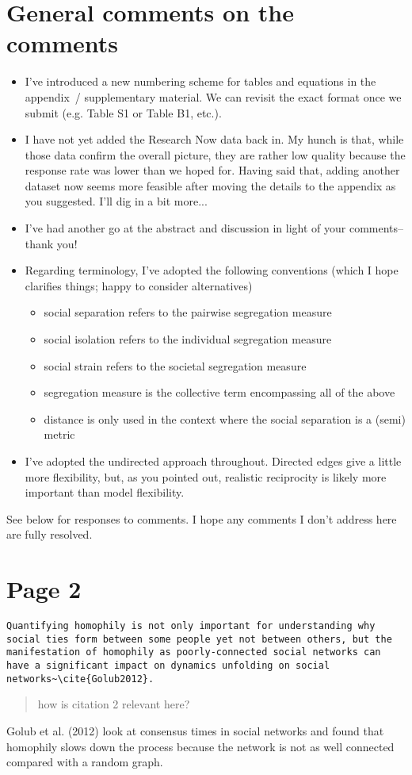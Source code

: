 \documentclass{scrartcl}
\begin{document}
\section*{General comments on the comments}

\begin{itemize}
\item I've introduced a new numbering scheme for tables and equations in the appendix~/ supplementary material. We can revisit the exact format once we submit (e.g. Table S1 or Table B1, etc.).
\item I have not yet added the Research Now data back in. My hunch is that, while those data confirm the overall picture, they are rather low quality because the response rate was lower than we hoped for. Having said that, adding another dataset now seems more feasible after moving the details to the appendix as you suggested. I'll dig in a bit more...
\item I've had another go at the abstract and discussion in light of your comments--thank you!
\item Regarding terminology, I've adopted the following conventions (which I hope clarifies things; happy to consider alternatives)
  \begin{itemize}
    \item social separation refers to the pairwise segregation measure
    \item social isolation refers to the individual segregation measure
    \item social strain refers to the societal segregation measure
    \item segregation measure is the collective term encompassing all of the above
    \item distance is only used in the context where the social separation is a (semi) metric
  \end{itemize}
\item I've adopted the undirected approach throughout. Directed edges give a little more flexibility, but, as you pointed out, realistic reciprocity is likely more important than model flexibility.
\end{itemize}
See below for responses to comments. I hope any comments I don't address here are fully resolved.

\section*{Page 2}

\begin{lstlisting}
Quantifying homophily is not only important for understanding why social ties form between some people yet not between others, but the manifestation of homophily as poorly-connected social networks can have a significant impact on dynamics unfolding on social networks~\cite{Golub2012}.
\end{lstlisting}
\begin{quote}
how is citation 2 relevant here?
\end{quote}
Golub et al. (2012) look at consensus times in social networks and found that homophily slows down the process because the network is not as well connected compared with a random graph.
\end{document}
